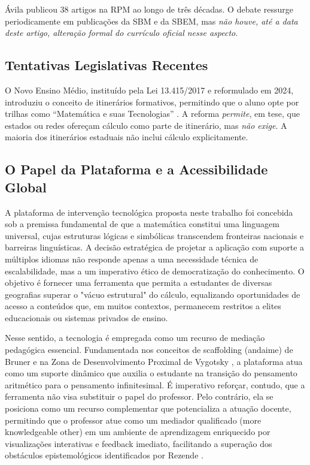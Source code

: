 \documentclass[12pt,a4paper,oneside]{article}
\begin{document}
Ávila publicou 38 artigos na RPM ao longo de três décadas. O
debate ressurge periodicamente em publicações da SBM e da SBEM,
mas \emph{não houve, até a data deste artigo, alteração
formal do currículo oficial nesse aspecto}.

\subsection{Tentativas Legislativas Recentes}

O Novo Ensino Médio, instituído pela Lei 13.415/2017 e reformulado
em 2024, introduziu o conceito de itinerários formativos,
permitindo que o aluno opte por trilhas como ``Matemática e suas
Tecnologias'' \cite{ref:mec-novo-em}. A reforma \emph{permite}, em
tese, que estados ou redes ofereçam cálculo como parte de
itinerário, mas \emph{não exige}. A maioria dos itinerários
estaduais não inclui cálculo explicitamente.



\subsection{O Papel da Plataforma e a Acessibilidade Global}
A plataforma de intervenção tecnológica proposta neste trabalho foi concebida 
sob a premissa fundamental de que a matemática constitui uma linguagem universal, 
cujas estruturas lógicas e simbólicas transcendem fronteiras nacionais e barreiras 
linguísticas. A decisão estratégica de projetar a aplicação com suporte a múltiplos 
idiomas não responde apenas a uma necessidade técnica de escalabilidade, mas a um 
imperativo ético de democratização do conhecimento. O objetivo é fornecer uma ferramenta 
que permita a estudantes de diversas geografias superar o "vácuo estrutural" do cálculo, 
equalizando oportunidades de acesso a conteúdos que, em muitos contextos, permanecem 
restritos a elites educacionais ou sistemas privados de ensino.

Nesse sentido, a tecnologia é empregada como um recurso de mediação pedagógica essencial. 
Fundamentada nos conceitos de scaffolding (andaime) de Bruner \cite{ref:bruner-1960} e na 
Zona de Desenvolvimento Proximal de Vygotsky \cite{ref:vygotsky-1978}, a plataforma atua 
como um suporte dinâmico que auxilia o estudante na transição do pensamento aritmético para 
o pensamento infinitesimal. É imperativo reforçar, contudo, que a ferramenta não visa substituir 
o papel do professor. Pelo contrário, ela se posiciona como um recurso complementar que potencializa 
a atuação docente, permitindo que o professor atue como um mediador qualificado (more knowledgeable other) 
em um ambiente de aprendizagem enriquecido por visualizações interativas e feedback imediato, facilitando 
a superação dos obstáculos epistemológicos identificados por Rezende \cite{rezende}.
\end{document}
